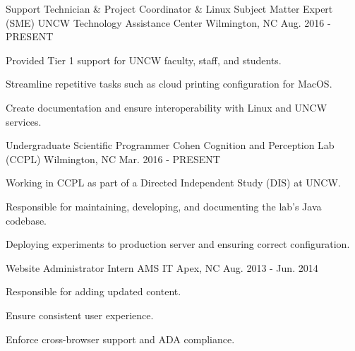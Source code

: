 

\begin{cventries}

  \cventry
    {Support Technician \& Project Coordinator \& Linux Subject Matter Expert (SME)} %
    {UNCW Technology Assistance Center} %
    {Wilmington, NC} %
    {Aug. 2016 - PRESENT} %
    {
      \begin{cvitems} %
        \item {Provided Tier 1 support for UNCW faculty, staff, and students.}
        \item {Streamline repetitive tasks such as cloud printing configuration for MacOS.}
        \item {Create documentation and ensure interoperability with Linux and UNCW services.}
      \end{cvitems}
    }

  \cventry
    {Undergraduate Scientific Programmer} %
    {Cohen Cognition and Perception Lab (CCPL)} %
    {Wilmington, NC} %
    {Mar. 2016 - PRESENT} %
    {
      \begin{cvitems}
        \item {Working in CCPL as part of a Directed Independent Study (DIS) at UNCW.}
        \item {Responsible for maintaining, developing, and documenting the lab's Java codebase.}
        \item {Deploying experiments to production server and ensuring correct configuration.}
      \end{cvitems}
    }
  \cventry
    {Website Administrator Intern} %
    {AMS IT} %
    {Apex, NC} %
    {Aug. 2013 - Jun. 2014} %
    {
      \begin{cvitems}
        \item {Responsible for adding updated content.}
        \item {Ensure consistent user experience.}
        \item {Enforce cross-browser support and ADA compliance.}
      \end{cvitems}
    }
\end{cventries}
